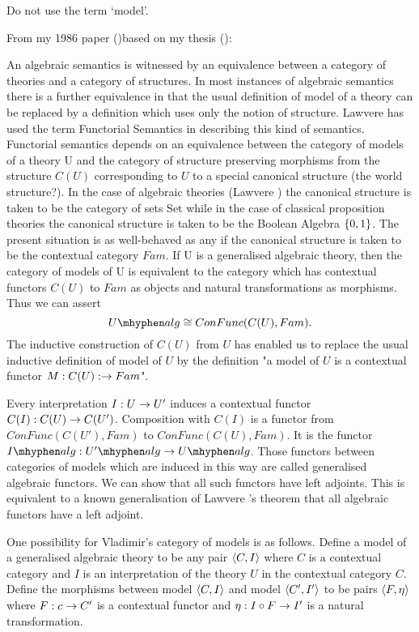 \documentclass[10pt,a4paper]{article}
\theoremstyle{remark}
\newcommand{\Ualg}{U \mhyphen alg}
\newcommand{\Upalg}{U' \mhyphen alg}
\newcommand{\Ialg}{I \mhyphen alg}
\begin{document}
\note Do not use the term `model'.

\note From my 1986 paper (\cite{Cartmell86})based on my thesis (\cite{Cartmell78}):
\begin{tightquote}
An algebraic semantics is witnessed by an equivalence between a category of
theories and a category of structures. In most instances of algebraic semantics
there is a further equivalence in that the usual definition of model of a theory can
be replaced by a definition which uses only the notion of structure. Lawvere has
used the term Functorial Semantics in describing this kind of semantics.
Functorial semantics depends on an equivalence between the category of models
of a theory U and the category of structure preserving morphisms from the
structure $C(U)$ corresponding to $U$ to a special canonical structure (the world
structure?). In the case of algebraic theories (Lawvere \cite{LawvereAlgebraicTheories}) the canonical structure
is taken to be the category of sets Set while in the case of classical proposition
theories the canonical structure is taken to be the Boolean Algebra $\left\{0, 1\right\}$.
The present situation is as well-behaved as any if the canonical structure is
taken to be the contextual category $Fam$.
If U is a generalised algebraic theory, then the category of models of U is
equivalent to the category which has contextual functors $C(U)$ to $Fam$ as objects
and natural transformations as morphisms. Thus we can assert
\begin{equation*}
\Ualg \cong ConFunc(C(U), Fam).
\end{equation*}
The inductive construction of $C(U)$ from $U$ has enabled us to replace the usual 
inductive definition of model of $U$ by the definition "a model of $U$ is a contextual
functor $M: C(U): \rightarrow Fam$".

Every interpretation $I:U \rightarrow U'$ induces a contextual functor 
$C(I):C(U) \rightarrow C(U')$. Composition with $C(I)$ is a functor from 
$ConFunc(C(U'),Fam)$ to
$ConFunc(C(U),Fam)$. It is the functor $\Ialg:\Upalg \morph \Ualg$. Those functors
between categories of models which are induced in this way are called generalised
algebraic functors. We can show that all such functors have left adjoints. This is
equivalent to a known generalisation of Lawvere \cite{LawvereAlgebraicTheories}'s theorem that all algebraic
functors have a left adjoint. 
\end{tightquote}

\begin{oldtt}
\note
One possibility for Vladimir's category of models is as follows. Define a model of a generalised algebraic theory to be any pair $\langle C,I\rangle$ where $C$ is a contextual category and $I$ is an interpretation of the theory $U$ in the contextual category $C$. Define the morphisms between
model $\langle C,I\rangle$ and model $\langle C',I'\rangle$ to be pairs $\langle F, \eta\rangle$ where
$F: c \rightarrow C'$ is a contextual functor and $\eta: I \circ F \rightarrow  I'$ is a natural transformation.
\end{oldtt}
\end{document}
